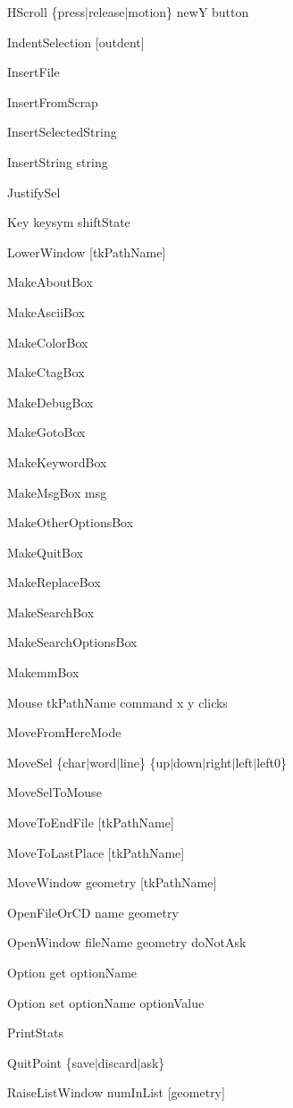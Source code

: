 \begin{description}
\item {HScroll \{press$\mid$release$\mid$motion\} newY button}
\item {IndentSelection [outdent]}
\item {InsertFile}
\item {InsertFromScrap}
\item {InsertSelectedString}
\item {InsertString string}
\item {JustifySel}
\item {Key keysym shiftState}
\item {LowerWindow [tkPathName]}
\item {MakeAboutBox}
\item {MakeAsciiBox}
\item {MakeColorBox}
\item {MakeCtagBox}
\item {MakeDebugBox}
\item {MakeGotoBox}
\item {MakeKeywordBox}
\item {MakeMsgBox msg}
\item {MakeOtherOptionsBox}
\item {MakeQuitBox}
\item {MakeReplaceBox}
\item {MakeSearchBox}
\item {MakeSearchOptionsBox}
\item {MakemmBox}
\item {Mouse tkPathName command x y clicks}
\item {MoveFromHereMode}
\item {MoveSel \{char$\mid$word$\mid$line\} \{up$\mid$down$\mid$right$\mid$left$\mid$left0\}}
\item {MoveSelToMouse}
\item {MoveToEndFile [tkPathName]}
\item {MoveToLastPlace [tkPathName]}
\item {MoveWindow geometry [tkPathName]}
\item {OpenFileOrCD name geometry}
\item {OpenWindow fileName geometry doNotAsk}
\item {Option get optionName}
\item {Option set optionName optionValue}
\item {PrintStats}
\item {QuitPoint \{save$\mid$discard$\mid$ask\}}
\item {RaiseListWindow numInList [geometry]}

\end{description}
